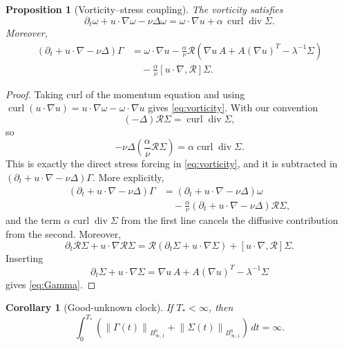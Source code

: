 \documentclass[10pt,a4paper]{amsart}
\numberwithin{equation}{section}
\newtheorem{proposition}[theorem]{Proposition}
\newtheorem{corollary}[theorem]{Corollary}
\newcommand{\divv}{\operatorname{div}}
\newcommand{\curl}{\operatorname{curl}}
\newcommand{\Besov}{B^0_{\infty,1}}
\newcommand{\calR}{\mathcal R}
\newcommand{\norm}[1]{\left\lVert #1\right\rVert}
\begin{document}
\begin{proposition}[Vorticity--stress coupling]
\label{prop:vorticity-stress}
The vorticity satisfies
\begin{equation}
  \partial_t\omega+u\cdot\nabla\omega-\nu\Delta\omega
  =
  \omega\cdot\nabla u+\alpha\,\curl\divv\Sigma .
  \label{eq:vorticity}
\end{equation}
Moreover,
\begin{equation}
\begin{aligned}
  (\partial_t+u\cdot\nabla-\nu\Delta)\Gamma
  &=
  \omega\cdot\nabla u
  -\frac{\alpha}{\nu}\calR
  \left(\nabla u\,A+A(\nabla u)^T-\lambda^{-1}\Sigma\right)\\
  &\quad
  -\frac{\alpha}{\nu}[u\cdot\nabla,\calR]\Sigma .
\end{aligned}
  \label{eq:Gamma}
\end{equation}
\end{proposition}

\begin{proof}
Taking curl of the momentum equation and using
\(\curl(u\cdot\nabla u)=u\cdot\nabla\omega-\omega\cdot\nabla u\) gives
\eqref{eq:vorticity}.  With our convention
\[
  (-\Delta)\calR\Sigma=\curl\divv\Sigma,
\]
so
\[
  -\nu\Delta\left(\frac{\alpha}{\nu}\calR\Sigma\right)
  =
  \alpha\curl\divv\Sigma .
\]
This is exactly the direct stress forcing in \eqref{eq:vorticity}, and it is
subtracted in \((\partial_t+u\cdot\nabla-\nu\Delta)\Gamma\).  More explicitly,
\[
\begin{aligned}
(\partial_t+u\cdot\nabla-\nu\Delta)\Gamma
&=(\partial_t+u\cdot\nabla-\nu\Delta)\omega\\
&\quad
-\frac{\alpha}{\nu}
(\partial_t+u\cdot\nabla-\nu\Delta)\calR\Sigma ,
\end{aligned}
\]
and the term \(\alpha\curl\divv\Sigma\) from the first line cancels the
diffusive contribution from the second.  Moreover,
\[
  \partial_t\calR\Sigma+u\cdot\nabla\calR\Sigma
  =
  \calR(\partial_t\Sigma+u\cdot\nabla\Sigma)
  +[u\cdot\nabla,\calR]\Sigma .
\]
Inserting
\[
  \partial_t\Sigma+u\cdot\nabla\Sigma
  =
  \nabla u\,A+A(\nabla u)^T-\lambda^{-1}\Sigma
\]
gives \eqref{eq:Gamma}.
\end{proof}

\begin{corollary}[Good-unknown clock]
\label{cor:good}
If \(T_*<\infty\), then
\[
  \int_0^{T_*}
  \left(
  \norm{\Gamma(t)}_{\Besov}
  +\norm{\Sigma(t)}_{\Besov}
  \right)\,dt=\infty .
\]
\end{corollary}
\end{document}
